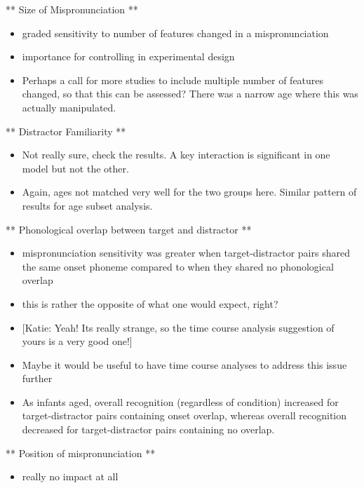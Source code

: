 \documentclass[man]{apa6}
\providecommand{\tightlist}{%
  \setlength{\itemsep}{0pt}\setlength{\parskip}{0pt}}
\theoremstyle{definition}
\theoremstyle{definition}
\theoremstyle{definition}
\theoremstyle{remark}
\begin{document}
** Size of Mispronunciation **

\begin{itemize}
\tightlist
\item
  graded sensitivity to number of features changed in a mispronunciation
\item
  importance for controlling in experimental design
\item
  Perhaps a call for more studies to include multiple number of features
  changed, so that this can be assessed? There was a narrow age where
  this was actually manipulated.
\end{itemize}

** Distractor Familiarity **

\begin{itemize}
\tightlist
\item
  Not really sure, check the results. A key interaction is significant
  in one model but not the other.
\item
  Again, ages not matched very well for the two groups here. Similar
  pattern of results for age subset analysis.
\end{itemize}

** Phonological overlap between target and distractor **

\begin{itemize}
\tightlist
\item
  mispronunciation sensitivity was greater when target-distractor pairs
  shared the same onset phoneme compared to when they shared no
  phonological overlap
\item
  this is rather the opposite of what one would expect, right?
\item
  {[}Katie: Yeah! Its really strange, so the time course analysis
  suggestion of yours is a very good one!{]}
\item
  Maybe it would be useful to have time course analyses to address this
  issue further
\item
  As infants aged, overall recognition (regardless of condition)
  increased for target-distractor pairs containing onset overlap,
  whereas overall recognition decreased for target-distractor pairs
  containing no overlap.
\end{itemize}

** Position of mispronunciation **

\begin{itemize}
\tightlist
\item
  really no impact at all
\end{itemize}
\end{document}
